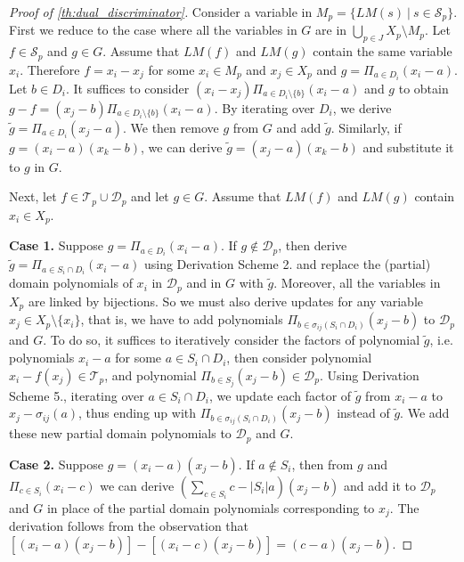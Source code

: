 \documentclass[11pt]{article}
\newcommand{\1}{\textbf{1}}
\begin{document}
\begin{proof} [Proof of \cref{th:dual_discriminator}]

Consider a variable in $M_p = \{LM(s) \ | \ s \in \mathcal{S}_p\}$. First we reduce to the case where all the variables in $G$ are in $\bigcup_{p \in J} X_p \setminus M_p$. Let $f \in \mathcal{S}_p$ and $g \in G$. Assume that $LM(f)$ and $LM(g)$ contain the same variable $x_i$. Therefore $f = x_i - x_j$ for some $x_i \in M_p$ and $x_j \in X_p$ and $g = \Pi_{a \in D_i}(x_i - a)$. Let $b \in D_i$. It suffices to consider $(x_i - x_j)\Pi_{a \in D_i \setminus \{ b \}}(x_i - a)$ and $g$ to obtain $g - f = (x_j - b)\Pi_{a \in D_i \setminus \{ b \}}(x_i - a)$. By iterating over $D_i$, we derive $\tilde{g} = \Pi_{a \in D_i}(x_j - a)$. We then remove $g$ from $G$ and add $\tilde{g}$. Similarly, if $g = (x_i - a)(x_k - b)$, we can derive $\tilde{g} = (x_j - a)(x_k -b)$ and substitute it to $g$ in $G$.

Next, let $f \in \mathcal{T}_p \cup \mathcal{D}_p$ and let $g \in G$. Assume that $LM(f)$ and $LM(g)$ contain $x_i \in X_p$.

\textbf{Case 1.} Suppose $g = \Pi_{a \in D_i} (x_i - a)$. If $g \notin \mathcal{D}_p$, then derive $\tilde{g} = \Pi_{a \in S_i \cap D_i} (x_i - a)$ using Derivation Scheme 2. and replace the (partial) domain polynomials of $x_i$ in $\mathcal{D}_p$ and in $G$ with $\tilde{g}$. Moreover, all the variables in $X_p$ are linked by bijections. So we must also derive updates for any variable $x_j \in X_p \setminus \{x_i\}$, that is, we have to add polynomials $\Pi_{b \in \sigma_{ij}(S_i \cap D_i)}(x_j - b)$ to $\mathcal{D}_p$ and $G$. To do so, it suffices to iteratively consider the factors of polynomial $\tilde{g}$, i.e. polynomials $x_i - a$ for some $a \in S_i \cap D_i$, then consider polynomial $x_i - f(x_j) \in \mathcal{T}_p$, and polynomial $\Pi_{b \in S_j} (x_j - b) \in \mathcal{D}_p$. Using Derivation Scheme 5., iterating over $a \in S_i \cap D_i$, we update each factor of $\tilde{g}$ from $x_i - a$ to $x_j - \sigma_{ij}(a)$, thus ending up with $\Pi_{b \in \sigma_{ij}(S_i \cap D_i)}(x_j - b)$ instead of $\tilde{g}$. We add these new partial domain polynomials to $\mathcal{D}_p$ and $G$.

\textbf{Case 2.} Suppose $ g = (x_i - a)(x_j - b)$. If $a \notin S_i$, then from $g$ and $\Pi_{c \in S_i}(x_i - c)$ we can derive $(\sum_{c \in S_i} c - |S_i| a)(x_j - b)$ and add it to $\mathcal{D}_p$ and $G$ in place of the partial domain polynomials corresponding to $x_j$. The derivation follows from the observation that $[(x_i - a)(x_j - b)] - [(x_i - c)(x_j - b)] = (c - a)(x_j - b)$.


\end{proof}
\end{document}
